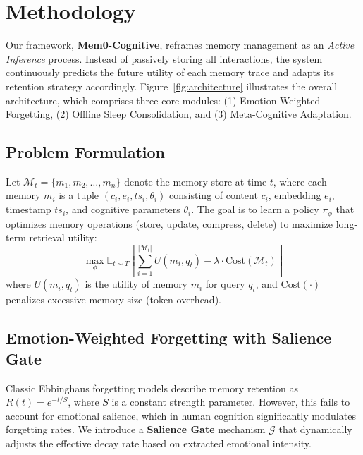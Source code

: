 \section{Methodology}
\label{sec:methodology}

Our framework, \textbf{Mem0-Cognitive}, reframes memory management as an \textit{Active Inference} process. Instead of passively storing all interactions, the system continuously predicts the future utility of each memory trace and adapts its retention strategy accordingly. Figure~\ref{fig:architecture} illustrates the overall architecture, which comprises three core modules: (1) Emotion-Weighted Forgetting, (2) Offline Sleep Consolidation, and (3) Meta-Cognitive Adaptation.

\subsection{Problem Formulation}
Let $\mathcal{M}_t = \{m_1, m_2, \dots, m_n\}$ denote the memory store at time $t$, where each memory $m_i$ is a tuple $(c_i, e_i, ts_i, \theta_i)$ consisting of content $c_i$, embedding $e_i$, timestamp $ts_i$, and cognitive parameters $\theta_i$. The goal is to learn a policy $\pi_\phi$ that optimizes memory operations (store, update, compress, delete) to maximize long-term retrieval utility:
\begin{equation}
    \max_\phi \mathbb{E}_{t \sim T} \left[ \sum_{i=1}^{|\mathcal{M}_t|} U(m_i, q_t) - \lambda \cdot \text{Cost}(\mathcal{M}_t) \right]
\end{equation}
where $U(m_i, q_t)$ is the utility of memory $m_i$ for query $q_t$, and $\text{Cost}(\cdot)$ penalizes excessive memory size (token overhead).

\subsection{Emotion-Weighted Forgetting with Salience Gate}
\label{subsec:forgetting}

Classic Ebbinghaus forgetting models describe memory retention as $R(t) = e^{-t/S}$, where $S$ is a constant strength parameter. However, this fails to account for emotional salience, which in human cognition significantly modulates forgetting rates. We introduce a \textbf{Salience Gate} mechanism $\mathcal{G}$ that dynamically adjusts the effective decay rate based on extracted emotional intensity.

